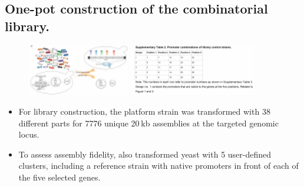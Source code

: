 \documentclass{beamer}
\begin{document}
\subsection{One-pot construction of the combinatorial library.}
\begin{frame}{}
	    \begin{figure}
		\centering
		\includegraphics[width=4.5cm]{pic/图片6.pdf}
		\includegraphics[width=5.5cm]{pic/图片7.pdf}
 	    \end{figure}
    \begin{itemize} [<+-| alert@+>] %
        \item For library construction, the platform strain was transformed with 38 different parts for 7776 unique 20 kb assemblies at the targeted genomic locus.
        \item  To assess assembly fidelity, also transformed yeast with 5 user-defined clusters, including a reference strain with native promoters in front of each of the five selected genes.
        
    \end{itemize}  


\end{frame}
\end{document}
